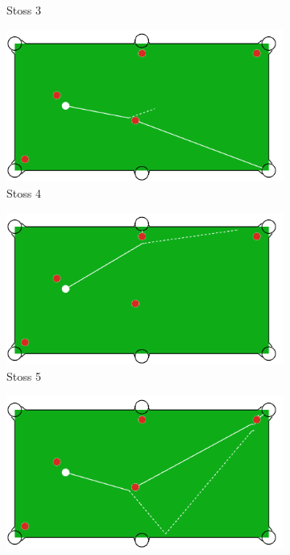 \begin{figure}[h!]
\begin{subfigure}[b]{0.3\textwidth}
        \caption{Stoss 3}
        \label{fig:situation_1_solution_3}
    \end{subfigure}
    \begin{subfigure}[b]{0.3\textwidth}
        \centering
        \includegraphics[width=1.0\linewidth]{../common/04_results/resources/simple_search/situation_diverse_solution_4.PNG}
        \caption{Stoss 4}
        \label{fig:situation_1_solution_4}
    \end{subfigure}
    \hfill
    \begin{subfigure}[b]{0.3\textwidth}
        \centering
        \includegraphics[width=1.0\linewidth]{../common/04_results/resources/simple_search/situation_diverse_solution_5.PNG}
        \caption{Stoss 5}
        \label{fig:situation_1_solution_5}
    \end{subfigure}
    \hfill
    \begin{subfigure}[b]{0.3\textwidth}
        \centering
        \includegraphics[width=1.0\linewidth]{../common/04_results/resources/simple_search/situation_diverse_solution_6.PNG}

\end{subfigure}
\end{figure}
